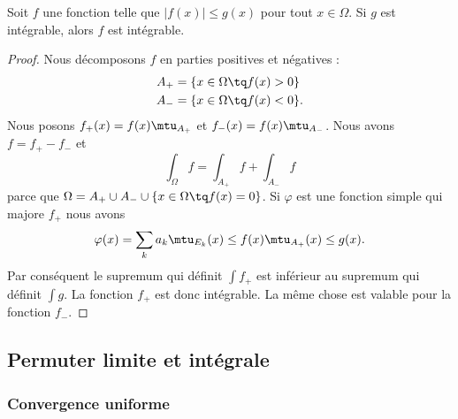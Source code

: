 \begin{lemma}   \label{LemPfHgal}
    Soit \( f\) une fonction telle que \( | f(x)|\leq g(x) \) pour tout \( x\in\Omega\). Si \( g\) est intégrable, alors \( f\) est intégrable.
\end{lemma}

\begin{proof}
    Nous décomposons \( f\) en parties positives et négatives :
    \begin{subequations}
        \begin{align}
            A_+&=\{ x\in\Omega\tq f(x)>0 \}\\
            A_-&=\{ x\in\Omega\tq f(x)<0 \}.
        \end{align}
    \end{subequations}
    Nous posons \( f_+(x)=f(x)\mtu_{A_+}\) et \( f_-(x)=f(x)\mtu_{A_-}\). Nous avons \( f=f_+-f_-\) et
    \begin{equation}
        \int_{\Omega}f=\int_{A_+}f+\int_{A_-}f
    \end{equation}
    parce que \( \Omega=A_+\cup A_-\cup\{ x\in\Omega\tq f(x)=0 \}\). Si \( \varphi\) est une fonction simple qui majore \( f_+\) nous avons
    \begin{equation}
        \varphi(x)=\sum_{k}a_k\mtu_{E_k}(x)\leq f(x)\mtu_{A_+}(x)\leq g(x).
    \end{equation}
    Par conséquent le supremum qui définit \( \int f_+\) est inférieur au supremum qui définit \( \int g\). La fonction \( f_+\) est donc intégrable. La même chose est valable pour la fonction \( f_-\).
\end{proof}

\subsection{Permuter limite et intégrale}

\subsubsection{Convergence uniforme}

